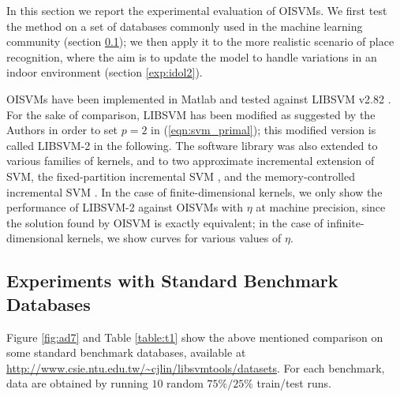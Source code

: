 In this section we report the experimental evaluation of OISVMs. We
first test the method on a set of databases commonly used in the
machine learning community (section \ref{exp:ml}); we then apply it to
the more realistic scenario of place recognition, where the aim is to
update the model to handle variations in an indoor environment
 (section
\ref{exp:idol2}).

OISVMs have been implemented in Matlab and tested against LIBSVM v2.82
\cite{ChangL01}. For the sake of comparison, LIBSVM has been modified
as suggested by the Authors in order to set $p=2$ in
(\ref{eqn:svm_primal}); this modified version is called LIBSVM-2 in
the following. 
The software library was also extended to various families of kernels,
and to two approximate incremental extension of SVM, the fixed-partition incremental
SVM \cite{syed99incremental}, and the memory-controlled incremental SVM \cite{luo:icra07}.
In the case of finite-dimensional kernels, we only show
the performance of LIBSVM-2 against OISVMs with $\eta$ at machine
precision, since the solution found by OISVM is exactly equivalent; in
the case of infinite-dimensional kernels, we show curves for
various values of $\eta$.

\subsection{Experiments with Standard Benchmark Databases}
\label{exp:ml}

Figure \ref{fig:ad7} and Table \ref{table:t1} show the above mentioned
comparison on some standard benchmark databases, available at
\url{http://www.csie.ntu.edu.tw/~cjlin/libsvmtools/datasets}.  For
each benchmark, data are obtained by running $10$ random $75\%/25\%$
train/test runs.

